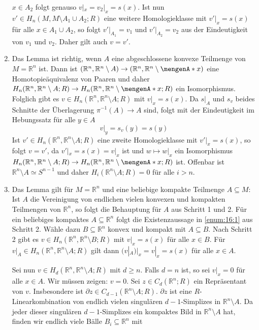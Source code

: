 \begin{enumerate}[label=\textbf{Schritt \arabic*:},wide=0cm]
	$x \in A_2$ folgt genauso $v|_x = v_2|_x =s(x)$. Ist nun $v' \in H_n(M,M \setminus A_1 \cup A_2;R)$ eine weitere Homologieklasse mit $v'|_x=s(x)$ für alle 
	$x \in A_1 \cup A_2$, so folgt $v'|_{A_1}=v_1$ und $v'|_{A_2}=v_2$ aus der Eindeutigkeit von $v_1$ und $v_2$. Daher gilt auch $v=v'$.
	\item Das Lemma ist richtig, wenn $A$ eine abgeschlossene konvexe Teilmenge von $M=\mathds{R}^n$ ist. Dann ist 
	$(\mathds{R}^n, \mathds{R}^n \setminus A) \to (\mathds{R}^n, \mathds{R}^n \setminus \set{x})$ eine Homotopieäquivalenz von Paaren und daher 
	$H_n(\mathds{R}^n, \mathds{R}^n \setminus A;R) \to H_n(\mathds{R}^n,\mathds{R}^n \setminus \set{x};R)$ ein Isomorphismus. Folglich gibt es 
	$v \in H_n(\mathds{R}^n,\mathds{R}^n \setminus A;R)$ mit $v|_x=s(x)$. Da $s|_A$ und $s_v$ beides Schnitte der Überlagerung $\pi ^{-1}(A) \to A$ sind, folgt mit der
	Eindeutigkeit im Hebungssatz für alle $y \in A$
	\[
		v\big|_y = s_v(y) = s(y)
	\]
	Ist $v' \in H_n(\mathds{R}^n, \mathds{R}^n \setminus A;R)$ eine zweite Homologieklasse mit $v'|_x=s(x)$, so folgt $v=v'$, da $v'|_x =s(x)=v|_x$ ist und $w \mapsto w|_x$
	ein Isomorphismus $H_n(\mathds{R}^n,\mathds{R}^n \setminus A;R) \to H_n(\mathds{R}^n, \mathds{R}^n\setminus \set{x};R )$ ist. Offenbar ist 
	$\mathds{R}^n \setminus A \simeq S^{n-1}$ und daher $H_i(\mathds{R}^n \setminus A;R)=0$ für alle $i >n$.
	\item Das Lemma gilt für $M=\mathds{R}^n$ und eine beliebige kompakte Teilmenge $A \subseteq M$: Ist $A$ die Vereinigung von endlichen vielen konvexen und kompakten 
	Teilmengen von $\mathds{R}^n$, so folgt die Behauptung für $A$ aus Schritt 1 und 2. Für ein beliebiges kompaktes $A \subseteq \mathds{R}^n$ folgt die Existenzaussage in 
	\ref{enum:16:1} aus Schritt 2. Wähle dazu $B \subseteq \mathds{R}^n$ konvex und kompakt mit $A \subseteq B$. Nach Schritt 2 gibt es 
	$v \in H_n(\mathds{R}^n, \mathds{R}^n \setminus B;R)$ mit $v|_x=s(x)$ für alle $x \in B$. Für $v|_A \in H_n(\mathds{R}^n,\mathds{R}^n \setminus A;R)$ gilt dann 
	$(v|_A)\big|_x = v|_x=s(x)$ für alle $x \in A$.
	
	Sei nun $v \in H_d(\mathds{R}^n,\mathds{R}^n \setminus A;R)$ mit $d \ge n$. Falls $d=n$ ist, so sei $v|_x=0$ für alle $x \in A$. Wir müssen zeigen: $v=0$. Sei 
	$z \in C_d(\mathds{R}^n;R)$ ein Repräsentant von $v$. Insbesondere ist $\partial z \in C_{d-1}(\mathds{R}^n \setminus A;R)$. $\partial z$ ist eine 
	$R$-Linearkombination von endlich vielen singulären $d-1$-Simplizes in $\mathds{R}^n \setminus A$. Da jeder dieser singulären $d-1$-Simplizes ein kompaktes Bild in 
	$\mathds{R}^n \setminus A$ hat, finden wir endlich viele Bälle $B_i \subseteq \mathds{R}^n$ mit
	

\end{enumerate}
